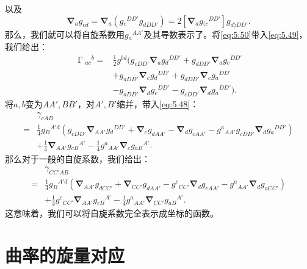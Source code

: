 以及
\begin{equation}
	\boldsymbol{\nabla }_{a} g_{cd} =\boldsymbol{\nabla }_{a} (g{_{c}}^{DD'} g_{dDD'} )=2[\boldsymbol{\nabla }_{a} g{_{( c}}^{DD'} ]g_{d) DD'} .
	\label{eq:5.50}
\end{equation}
那么，我们就可以将自旋系数用$g{_{a}}^{AA'}$及其导数表示了。将\ref{eq:5.50}带入\ref{eq:5.49}，我们给出：
\begin{equation}
	\begin{aligned}
		\upGamma {_{ac}}^{b} = & \frac{1}{2} g^{bd} (g_{cDD'}\boldsymbol{\nabla }_{a} g{_{d}}^{DD'} +g_{dDD'}\boldsymbol{\nabla }_{a} g{_{c}}^{DD'}\\
		& +g_{aDD'}\boldsymbol{\nabla }_{c} g{_{d}}^{DD'} +g_{dDD'}\boldsymbol{\nabla }_{c} g{_{a}}^{DD'}\\
		& -g_{aDD'}\boldsymbol{\nabla }_{d} g{_{c}}^{DD'} -g_{cDD'}\boldsymbol{\nabla }_{d} g{_{a}}^{DD'} ).
	\end{aligned}
	\label{eq:5.51}
\end{equation}
将$a,b$变为$AA',BB'$，对$A',B'$缩并，带入\ref{eq:5.48}：
\begin{equation*}
	\begin{aligned}
		& \gamma _{cAB}\\
		= & \frac{1}{4} g{_{B}}^{A'd} (g_{cDD'}\boldsymbol{\nabla }_{AA'} g{_{d}}^{DD'} +\boldsymbol{\nabla }_{c} g_{dAA'} -\boldsymbol{\nabla }_{d} g_{cAA'} -g^{a}{}_{AA'} g_{cDD'}\boldsymbol{\nabla }_{d} g{_{a}}^{DD'} )\\
		& +\frac{1}{4}\boldsymbol{\nabla }_{AA'} g{_{cB}}^{A'} -\frac{1}{4} g^{a}{}_{AA'}\boldsymbol{\nabla }_{c} g{_{aB}}^{A'} .
	\end{aligned}
\end{equation*}
那么对于一般的自旋系数，我们给出：
\begin{equation}
	\begin{aligned}
		& \gamma _{CC'AB}\\
		= & \frac{1}{4} g{_{B}}^{A'd} (\boldsymbol{\nabla }_{AA'} g_{dCC'} +\boldsymbol{\nabla }_{CC'} g_{dAA'} -g^{c}{}_{CC'}\boldsymbol{\nabla }_{d} g_{cAA'} -g^{a}{}_{AA'}\boldsymbol{\nabla }_{d} g_{aCC'} )\\
		& +\frac{1}{4} g^{c}{}_{CC'}\boldsymbol{\nabla }_{AA'} g{_{cB}}^{A'} -\frac{1}{4} g^{a}{}_{AA'}\boldsymbol{\nabla }_{CC'} g{_{aB}}^{A'} .
	\end{aligned}
	\label{eq:5.52}
\end{equation}
这意味着，我们可以将自旋系数完全表示成坐标的函数。


\section{曲率的旋量对应}
